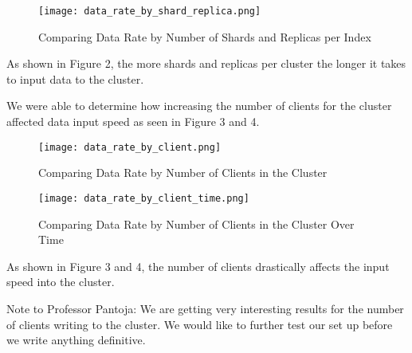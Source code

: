 \documentclass[journal]{IEEEtran}
\begin{document}
\begin{figure}
  \centering
  \texttt{[image: data\_rate\_by\_shard\_replica.png]}
 \caption{Comparing Data Rate by Number of Shards and Replicas per Index}
\end{figure}

As shown in Figure 2, the more shards and replicas per cluster the longer it takes to input data to the cluster. 

We were able to determine how increasing the number of clients for the cluster affected data input speed as seen in Figure 3 and 4.

\begin{figure}
    \centering
    \texttt{[image: data\_rate\_by\_client.png]}
    \caption{Comparing Data Rate by Number of Clients in the Cluster}
\end{figure}

\begin{figure}
    \centering
    \texttt{[image: data\_rate\_by\_client\_time.png]}
    \caption{Comparing Data Rate by Number of Clients in the Cluster Over Time}
\end{figure}


As shown in Figure 3 and 4, the number of clients drastically affects the input speed into the cluster. 

Note to Professor Pantoja: We are getting very interesting results for the number of clients writing to the cluster. We would like to further test our set up before we write anything definitive.


\end{document}
